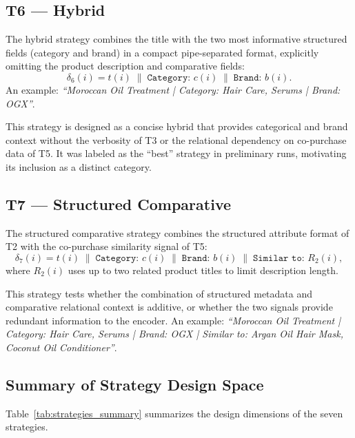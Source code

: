 \documentclass[12pt,a4paper]{report}
\begin{document}
\subsection{T6 --- Hybrid}

The hybrid strategy combines the title with the two most
informative structured fields (category and brand) in a
compact pipe-separated format, explicitly omitting the
product description and comparative fields:
\begin{equation}
  \delta_6(i) = t(i)
    \;\|\; \texttt{Category: } c(i)
    \;\|\; \texttt{Brand: } b(i).
\end{equation}
An example: \textit{``Moroccan Oil Treatment | Category:
Hair Care, Serums | Brand: OGX''}.

This strategy is designed as a concise hybrid that provides
categorical and brand context without the verbosity of T3
or the relational dependency on co-purchase data of T5.
It was labeled as the ``best'' strategy in preliminary runs,
motivating its inclusion as a distinct category.

\subsection{T7 --- Structured Comparative}

The structured comparative strategy combines the structured
attribute format of T2 with the co-purchase similarity
signal of T5:
\begin{equation}
  \delta_7(i) = t(i)
    \;\|\; \texttt{Category: } c(i)
    \;\|\; \texttt{Brand: } b(i)
    \;\|\; \texttt{Similar to: } R_2(i),
\end{equation}
where $R_2(i)$ uses up to two related product titles to limit
description length.

This strategy tests whether the combination of structured
metadata and comparative relational context is additive,
or whether the two signals provide redundant information
to the encoder. An example: \textit{``Moroccan Oil Treatment
| Category: Hair Care, Serums | Brand: OGX | Similar to:
Argan Oil Hair Mask, Coconut Oil Conditioner''}.

\subsection{Summary of Strategy Design Space}

Table~\ref{tab:strategies_summary} summarizes the design
dimensions of the seven strategies.
\end{document}
